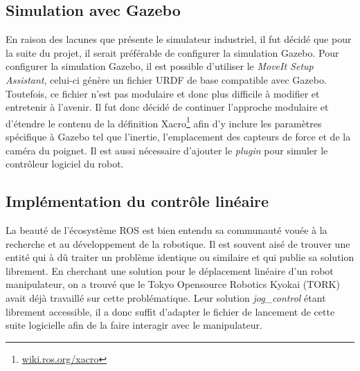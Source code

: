 \subsection{Simulation avec Gazebo}
En raison des lacunes que présente le simulateur industriel, il fut décidé que pour la suite du projet, il serait préférable de configurer la simulation Gazebo. Pour configurer la simulation Gazebo, il est possible d'utiliser le \emph{MoveIt Setup Assistant}, celui-ci génère un fichier URDF de base compatible avec Gazebo. Toutefois, ce fichier n'est pas modulaire et donc plus difficile à modifier et entretenir à l'avenir. Il fut donc décidé de continuer l'approche modulaire et d'étendre le contenu de la définition Xacro\footnote{\href{http://wiki.ros.org/xacro}{wiki.ros.org/xacro}} afin d'y inclure les paramètres spécifique à Gazebo tel que l'inertie, l'emplacement des capteurs de force et de la caméra du poignet. Il est aussi nécessaire d'ajouter le \emph{plugin} pour simuler le contrôleur logiciel du robot.


\subsection{Implémentation du contrôle linéaire}
La beauté de l'écosystème ROS est bien entendu sa communauté vouée à la recherche et au développement de la robotique. Il est souvent aisé de trouver une entité qui à dû traiter un problème identique ou similaire et qui publie sa solution librement. En cherchant une solution pour le déplacement linéaire d'un robot manipulateur, on a trouvé que le Tokyo Opensource Robotics Kyokai (TORK) avait déjà travaillé sur cette problématique. Leur solution \emph{jog\_control} étant librement accessible, il a donc suffit d'adapter le fichier de lancement de cette suite logicielle afin de la faire interagir avec le manipulateur.


